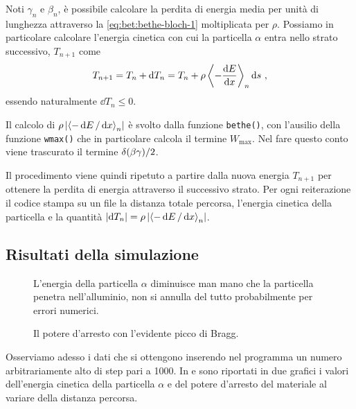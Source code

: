         Noti $\gamma_n$ e $\beta_n$, è possibile calcolare la perdita di energia media per unità di lunghezza attraverso la \eqref{eq:bet:bethe-bloch-1} moltiplicata per $\rho$. Possiamo in particolare calcolare l'energia cinetica con cui la particella $\alpha$ entra nello strato successivo, $T_{n + 1}$ come
        \begin{equation*}
            T_{n + 1} = T_n + \dd{T_n} = T_n + \rho\, {\left\langle - \dv{E}{x} \right\rangle}_n \dd{s}
            \,,
        \end{equation*}
        essendo naturalmente $\dd{T_n} \leq 0$.
        
        Il calcolo di $\rho\,\abs{{\left\langle - \dd{E} / \dd{x} \right\rangle}_n}$ è svolto dalla funzione \texttt{bethe()}, con l'ausilio della funzione \texttt{wmax()} che in particolare calcola il termine $W_\text{max}$. Nel fare questo conto viene trascurato il termine $\delta\pqty{\beta\gamma}/2$.
        
        Il procedimento viene quindi ripetuto a partire dalla nuova energia $T_{n + 1}$ per ottenere la perdita di energia attraverso il successivo strato. Per ogni reiterazione il codice stampa su un file la distanza totale percorsa, l'energia cinetica della particella e la quantità $\abs{\dd{T_n}} = \rho\,\abs{{\left\langle - \dd{E} / \dd{x} \right\rangle}_n}$.

    \subsection{Risultati della simulazione}
        \begin{figure}
            \centering
            
            \caption{L'energia della particella $\alpha$ diminuisce man mano che la particella penetra nell'alluminio, non si annulla del tutto probabilmente per errori numerici.}
            \label{fig:bet:alpha-1}
        \end{figure}
        \begin{figure}
            \centering
            
            \caption{Il potere d'arresto con l'evidente picco di Bragg.}
            \label{fig:bet:alpha-2}
        \end{figure}
        Osserviamo adesso i dati che si ottengono inserendo nel programma un numero arbitrariamente alto di step pari a \num{1000}. In  e  sono riportati in due grafici i valori dell'energia cinetica della particella $\alpha$ e del potere d'arresto del materiale al variare della distanza percorsa.
        
